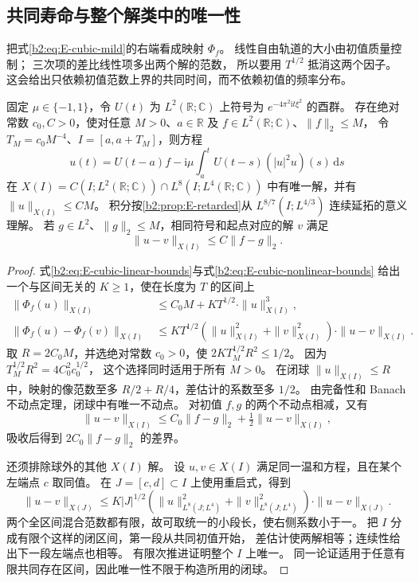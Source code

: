 \subsection{共同寿命与整个解类中的唯一性}
\label{b2:subsec:E-cubic-local}

把式\eqref{b2:eq:E-cubic-mild}的右端看成映射 \(\Phi_f\)。
线性自由轨道的大小由初值质量控制；
三次项的差比线性项多出两个解的范数，
所以要用 \(T^{1/2}\) 抵消这两个因子。
这会给出只依赖初值范数上界的共同时间，而不依赖初值的频率分布。

\begin{theorem}[一维三次模型的局部温和解]\label{b2:thm:E-cubic-local}
固定 \(\mu\in\{-1,1\}\)，令 \(U(t)\) 为
\(L^2(\mathbb R;\mathbb C)\) 上符号为 \(e^{-4\pi^2\mathrm it\xi^2}\) 的酉群。
存在绝对常数 \(c_0,C>0\)，使对任意 \(M>0\)、\(a\in\mathbb R\) 及
\(f\in L^2(\mathbb R;\mathbb C)\)、\(\|f\|_2\le M\)，
令 \(T_M=c_0M^{-4}\)、\(I=[a,a+T_M]\)，则方程
\[
 u(t)=U(t-a)f-\mathrm i\mu\int_a^tU(t-s)(|u|^2u)(s)\,\mathrm ds
\]
在 \(X(I)=C(I;L^2(\mathbb R;\mathbb C))\cap L^8(I;L^4(\mathbb R;\mathbb C))\)
中有唯一解，并有 \(\|u\|_{X(I)}\le CM\)。
积分按\cref{b2:prop:E-retarded}从 \(L^{8/7}(I;L^{4/3})\) 连续延拓的意义理解。
若 \(g\in L^2\)、\(\|g\|_2\le M\)，相同符号和起点对应的解 \(v\) 满足
\[
 \|u-v\|_{X(I)}\le C\|f-g\|_2.
\]
\end{theorem}
\begin{proof}
式\eqref{b2:eq:E-cubic-linear-bounds}与式\eqref{b2:eq:E-cubic-nonlinear-bounds}%
给出一个与区间无关的 \(K\ge1\)，使在长度为 \(T\) 的区间上
\[
 \begin{aligned}
 \|\Phi_f(u)\|_{X(I)}
 &\le C_0M+KT^{1/2}\cdot\|u\|_{X(I)}^3,\\
 \|\Phi_f(u)-\Phi_f(v)\|_{X(I)}
 &\le KT^{1/2}\left(\|u\|_{X(I)}^2+\|v\|_{X(I)}^2\right)
                  \cdot\|u-v\|_{X(I)}.
 \end{aligned}
\]
取 \(R=2C_0M\)，并选绝对常数 \(c_0>0\)，使
\(2KT_M^{1/2}R^2\le1/2\)。
因为 \(T_M^{1/2}R^2=4C_0^2c_0^{1/2}\)，
这个选择同时适用于所有 \(M>0\)。
在闭球 \(\|u\|_{X(I)}\le R\) 中，映射的像范数至多
\(R/2+R/4\)，差估计的系数至多 \(1/2\)。
由完备性和 Banach 不动点定理，闭球中有唯一不动点。
对初值 \(f,g\) 的两个不动点相减，又有
\[
 \|u-v\|_{X(I)}
 \le C_0\|f-g\|_2+\tfrac12\|u-v\|_{X(I)},
\]
吸收后得到 \(2C_0\|f-g\|_2\) 的差界。

还须排除球外的其他 \(X(I)\) 解。
设 \(u,v\in X(I)\) 满足同一温和方程，且在某个左端点 \(c\) 取同值。
在 \(J=[c,d]\subset I\) 上使用重启式，得到
\[
 \|u-v\|_{X(J)}
 \le K|J|^{1/2}
   \left(\|u\|_{L^8(J;L^4)}^2+\|v\|_{L^8(J;L^4)}^2\right)
   \cdot\|u-v\|_{X(J)}.
\]
两个全区间混合范数都有限，故可取统一的小段长，使右侧系数小于一。
把 \(I\) 分成有限个这样的闭区间，第一段从共同初值开始，
差估计使两解相等；连续性给出下一段左端点也相等。
有限次推进证明整个 \(I\) 上唯一。
同一论证适用于任意有限共同存在区间，因此唯一性不限于构造所用的闭球。
\end{proof}

